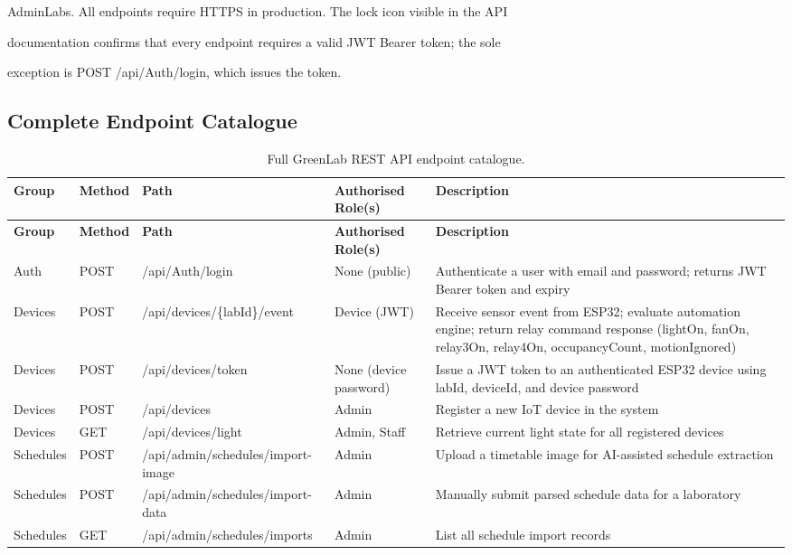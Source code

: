 AdminLabs. All endpoints require HTTPS in production. The lock icon visible in the API

documentation confirms that every endpoint requires a valid JWT Bearer token; the sole

exception is POST /api/Auth/login, which issues the token.


\subsection{Complete Endpoint Catalogue}
{\small\sloppy
\begin{longtable}{|L{1.8cm}|L{0.8cm}|L{5.2cm}|L{1.8cm}|L{4.5cm}|}
\caption{Full GreenLab REST API endpoint catalogue.} \label{tab:4-8} \\
\hline
{}
\textbf{Group} & \textbf{Method} & \textbf{Path} & \textbf{Authorised Role(s)} & \textbf{Description} \\
\hline
\endfirsthead
\hline
{}
\textbf{Group} & \textbf{Method} & \textbf{Path} & \textbf{Authorised Role(s)} & \textbf{Description} \\
\hline
\endhead
\hline
\endfoot
\hline
\endlastfoot
Auth & POST & /api/Auth/login & None (public) & Authenticate a user with email and password; returns JWT Bearer token and expiry \\
\hline
Devices & POST & /api/devices/\{labId\}/event & Device (JWT) & Receive sensor event from ESP32; evaluate automation engine; return relay command response (lightOn, fanOn, relay3On, relay4On, occupancyCount, motionIgnored) \\
\hline
Devices & POST & /api/devices/token & None (device password) & Issue a JWT token to an authenticated ESP32 device using labId, deviceId, and device password \\
\hline
Devices & POST & /api/devices & Admin & Register a new IoT device in the system \\
\hline
Devices & GET & /api/devices/light & Admin, Staff & Retrieve current light state for all registered devices \\
\hline
Schedules & POST & /api/admin/schedules/import-image & Admin & Upload a timetable image for AI-assisted schedule extraction \\
\hline
Schedules & POST & /api/admin/schedules/import-data & Admin & Manually submit parsed schedule data for a laboratory \\
\hline
Schedules & GET & /api/admin/schedules/imports & Admin & List all schedule import records \\

\end{longtable}}
